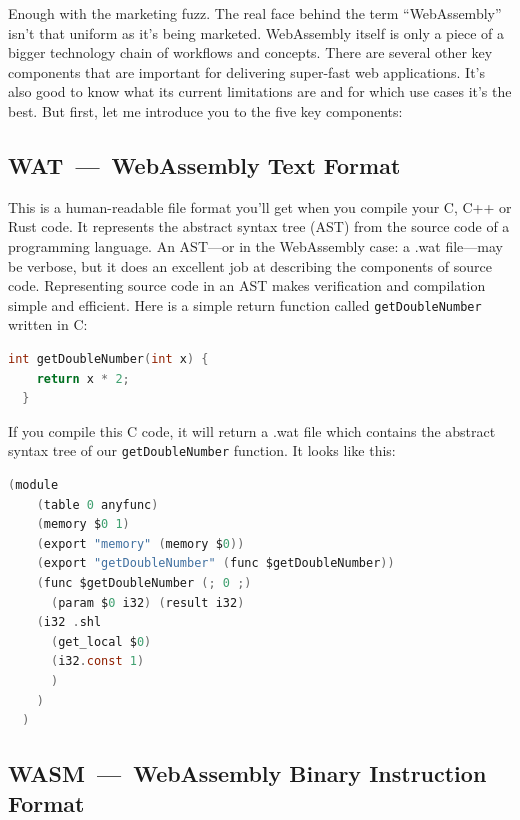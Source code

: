\documentclass[10pt]{article}  %
\begin{document}
\begin{sloppypar}
  Enough with the marketing fuzz. The real face behind the term “WebAssembly” isn’t that uniform as it’s being marketed. WebAssembly itself is only a piece of a bigger technology chain of workflows and concepts. There are several other key components that are important for delivering super-fast web applications. It’s also good to know what its current limitations are and for which use cases it’s the best. But first, let me introduce you to the five key components:

  \subsection{WAT~—~WebAssembly Text Format}
  \label{sec:webassembly-text-format}

  This is a human-readable file format you’ll get when you compile your C, C++ or Rust code. It represents the abstract syntax tree (AST) from the source code of a programming language. An AST—or in the WebAssembly case: a .wat file—may be verbose, but it does an excellent job at describing the components of source code. Representing source code in an AST makes verification and compilation simple and efficient. Here is a simple return function called \lstinline{getDoubleNumber} written in C:

  \vspace{7pt}
  \begin{lstlisting}[language=C, caption=Code example in C., label=lst:c-example]
  int getDoubleNumber(int x) {
    return x * 2;
  }\end{lstlisting}

  If you compile this C code, it will return a .wat file which contains the abstract syntax tree of our \lstinline{getDoubleNumber} function. It looks like this:

  \vspace{7pt}
  \begin{lstlisting}[language=C, caption=Code example from above compiled into the WebAssembly Text Format., label=lst:wat-example]
  (module
    (table 0 anyfunc)
    (memory $0 1)
    (export "memory" (memory $0))
    (export "getDoubleNumber" (func $getDoubleNumber))
    (func $getDoubleNumber (; 0 ;)
      (param $0 i32) (result i32)
    (i32 .shl
      (get_local $0)
      (i32.const 1)
      )
    )
  )\end{lstlisting}

  \subsection{WASM~—~WebAssembly Binary Instruction Format}
  \label{sec:webassembly-binary-instruction-format}


\end{sloppypar}
\end{document}
